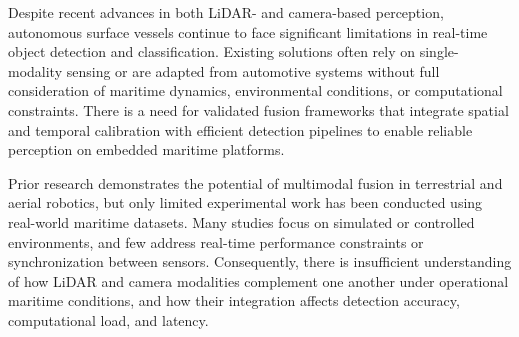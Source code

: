 \documentclass{erauthesis}
\begin{document}
Despite recent advances in both LiDAR- and camera-based perception, autonomous surface vessels continue to face significant limitations in real-time object detection and classification. 
Existing solutions often rely on single-modality sensing or are adapted from automotive systems without full consideration of maritime dynamics, environmental conditions, or computational constraints. 
There is a need for validated fusion frameworks that integrate spatial and temporal calibration with efficient detection pipelines to enable reliable perception on embedded maritime platforms.

Prior research demonstrates the potential of multimodal fusion in terrestrial and aerial robotics, but only limited experimental work has been conducted using real-world maritime datasets. 
Many studies focus on simulated or controlled environments, and few address real-time performance constraints or synchronization between sensors. 
Consequently, there is insufficient understanding of how LiDAR and camera modalities complement one another under operational maritime conditions, and how their integration affects detection accuracy, computational load, and latency.
\end{document}
